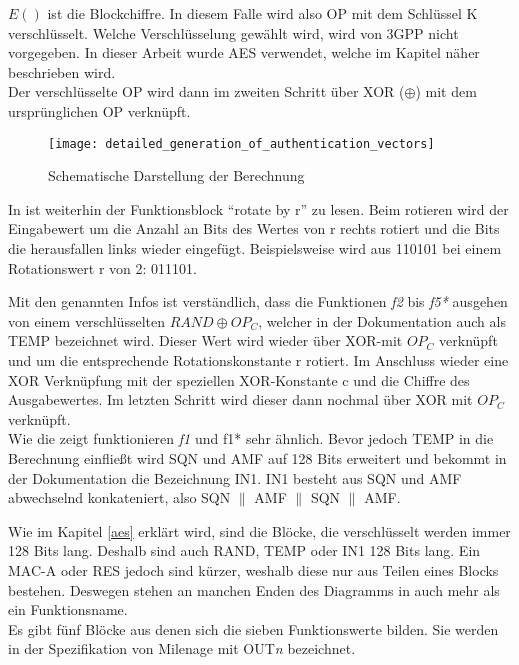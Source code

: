  $E()$ ist die Blockchiffre. In diesem Falle wird also \ac{OP} mit dem Schlüssel K
 verschlüsselt. Welche Verschlüsselung gewählt wird, wird von 3GPP nicht vorgegeben. In
 dieser Arbeit wurde \ac{AES} verwendet, welche im Kapitel  näher beschrieben wird. \\
 Der verschlüsselte OP wird dann im zweiten Schritt über XOR ($\oplus$) mit dem ursprünglichen
 OP verknüpft.
 
 \begin{figure}[ht]
  \begin{center}
   \texttt{[image: detailed\_generation\_of\_authentication\_vectors]}
  \end{center}
  \caption[Schematische Darstellung der Berechnung der Authentifizierungsvektoren]{Schematische Darstellung der Berechnung \cite{3gpp.33.102}}
  \label{fig:schematisch_milenage}
 \end{figure}
 
 In  ist weiterhin der Funktionsblock ``rotate by r'' zu lesen.
 Beim rotieren wird der Eingabewert um die Anzahl an Bits des Wertes von r rechts rotiert und %
 die Bits die herausfallen links wieder eingefügt. Beispielsweise wird aus 110101 bei einem
 Rotationswert r von 2: 011101.
 
 Mit den genannten Infos ist verständlich, dass die Funktionen \emph{f2} bis \emph{f5*}
 ausgehen von einem verschlüsselten $RAND \oplus OP_C$, welcher in der Dokumentation
 auch als TEMP bezeichnet wird. Dieser Wert wird wieder über XOR-mit $OP_ C$ verknüpft
 und um die entsprechende Rotationskonstante r rotiert. Im Anschluss wieder eine XOR
 Verknüpfung mit der speziellen XOR-Konstante c und die Chiffre des Ausgabewertes. Im
 letzten Schritt wird dieser dann nochmal über XOR mit $OP_{C}$ verknüpft. \\
 Wie die  zeigt funktionieren \emph{f1} und {f1*} sehr
 ähnlich. Bevor jedoch TEMP in die Berechnung einfließt wird SQN und AMF auf 128 Bits
 erweitert und bekommt in der Dokumentation die Bezeichnung IN1. IN1 besteht aus SQN und
 AMF abwechselnd konkateniert, also SQN $\|$ AMF $\|$ SQN $\|$ AMF. \cite{3gpp.33.102}
 
 Wie im Kapitel \ref{aes} erklärt wird, sind die Blöcke, die verschlüsselt werden immer
 128 Bits lang. Deshalb sind auch RAND, TEMP oder IN1 128 Bits lang. Ein MAC-A oder RES
 jedoch sind kürzer, weshalb diese nur aus Teilen eines Blocks bestehen. Deswegen stehen
 an manchen Enden des Diagramms in  auch mehr als ein
 Funktionsname. \\
 Es gibt fünf Blöcke aus denen sich die sieben Funktionswerte bilden. Sie werden in der
 Spezifikation von Milenage mit OUT\emph{n} bezeichnet.
 
